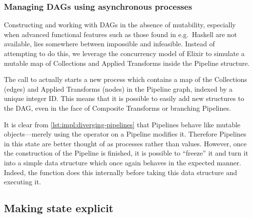 \subsubsection{Managing DAGs using asynchronous processes}


Constructing and working with DAGs in the absence of mutability, especially when advanced functional features such as those found in e.g.\ Haskell are not available, lies somewhere between impossible and infeasible.
Instead of attempting to do this, we leverage the concurrency model of Elixir to simulate a mutable map of Collections and Applied Transforms inside the Pipeline structure.


The call to  actually starts a new process which contains a map of the Collections (edges) and Applied Transforms (nodes) in the Pipeline graph, indexed by a unique integer ID.
This means that it is possible to easily add new structures to the DAG, even in the face of Composite Transforms or branching Pipelines.

It is clear from \cref{lst:impl:diverging-pipelines} that Pipelines behave like mutable objects---merely using the \exs{~>} operator on a Pipeline modifies it.
Therefore Pipelines in this state are better thought of as processes rather than values.
However, once the construction of the Pipeline is finished, it is possible to ``freeze'' it and turn it into a simple data structure which once again behaves in the expected manner.
Indeed, the  function does this internally before taking this data structure and executing it.

\subsection{Making state explicit}\label{sec:impl:approach:state-explicit}


